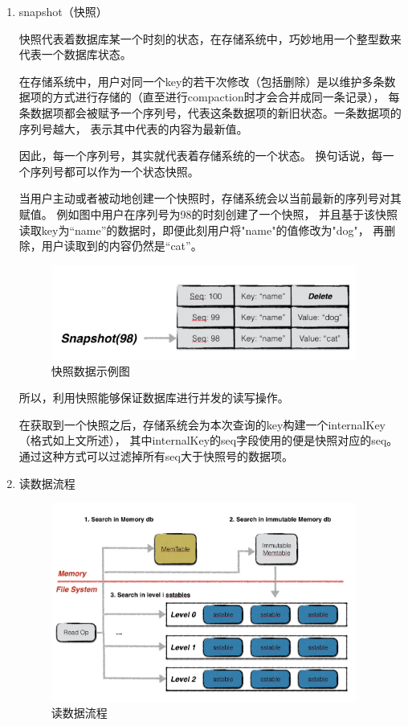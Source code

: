 		\begin{enumerate}
		\item snapshot（快照）
		
		快照代表着数据库某一个时刻的状态，在存储系统中，巧妙地用一个整型数来代表一个数据库状态。

		在存储系统中，用户对同一个key的若干次修改（包括删除）是以维护多条数据项的方式进行存储的（直至进行compaction时才会合并成同一条记录），
		每条数据项都会被赋予一个序列号，代表这条数据项的新旧状态。一条数据项的序列号越大，
		表示其中代表的内容为最新值。

		因此，每一个序列号，其实就代表着存储系统的一个状态。
		换句话说，每一个序列号都可以作为一个状态快照。

		当用户主动或者被动地创建一个快照时，存储系统会以当前最新的序列号对其赋值。
		例如图中用户在序列号为98的时刻创建了一个快照，
		并且基于该快照读取key为“name”的数据时，即便此刻用户将"name"的值修改为"dog"，
		再删除，用户读取到的内容仍然是“cat”。

		\begin{figure}[H]
			\centering
			\includegraphics[width=0.95\textwidth]{images/snapshot}
			\caption{快照数据示例图}
			\label{snapshot}
		\end{figure}

		所以，利用快照能够保证数据库进行并发的读写操作。

		在获取到一个快照之后，存储系统会为本次查询的key构建一个internalKey（格式如上文所述），
		其中internalKey的seq字段使用的便是快照对应的seq。
		通过这种方式可以过滤掉所有seq大于快照号的数据项。
		

		\item 读数据流程
		
		\begin{figure}[H]
			\centering
			\includegraphics[width=0.95\textwidth]{images/readop}
			\caption{读数据流程}
			\label{readop}
		\end{figure}


\end{enumerate}
